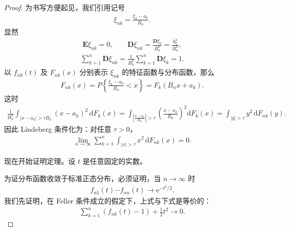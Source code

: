 \documentclass[../../main.tex]{subfiles}
\begin{document}
\begin{proof}
为书写方便起见，我们引用记号
\begin{align}
\xi_{nk}=\frac{\xi_k-a_k}{B_n}.
\end{align}
显然
\begin{align}
\boldsymbol{E}\xi_{nk}=0,\qquad\boldsymbol{D}\xi_{nk}=\frac{\boldsymbol{D}\xi_k}{B_n^{2}}=\frac{b_k^{2}}{B_n^{2}},
\end{align}
\begin{align}
\sum_{k=1}^{n}\boldsymbol{D}\xi_{nk}=\frac{1}{B_n^{2}}\sum_{k=1}^{n}\boldsymbol{D}\xi_k=1.
\end{align}
以 $f_{nk}(t)$ 及 $F_{nk}(x)$ 分别表示 $\xi_{nk}$ 的特征函数与分布函数，那么
\begin{align}
F_{nk}(x)=P\!\left\{\frac{\xi_k-a_k}{B_n}<x\right\}=F_k(B_nx+a_k).
\end{align}
这时
\begin{align*}
\frac{1}{B_n^{2}}\int_{|x-a_k|>\tau B_n}(x-a_k)^{2}\,\mathrm{d}F_k(x)
=\int_{\left|\frac{x-a_k}{B_n}\right|>\tau}\left(\frac{x-a_k}{B_n}\right)^{2}\mathrm{d}F_k(x)
=\int_{|y|>\tau}y^{2}\,\mathrm{d}F_{nk}(y).
\end{align*}
因此 Lindeberg 条件化为：对任意 $\tau>0$，
\begin{align}
\lim_{n\to\infty}\sum_{k=1}^{n}\int_{|x|>\tau}x^{2}\,\mathrm{d}F_{nk}(x)=0.
\end{align}

现在开始证明定理。设 $t$ 是任意固定的实数。

为证分布函数收敛于标准正态分布，必须证明，当 $n\to\infty$ 时
\begin{align}
f_{n1}(t)\cdots f_{nn}(t)\to\mathrm{e}^{-t^{2}/2}.
\end{align}
我们先证明，在 Feller 条件成立的假定下，上式与下式是等价的：
\begin{align}
\sum_{k=1}^{n}(f_{nk}(t)-1)+\frac12t^{2}\to0.
\end{align}


\end{proof}
\end{document}

